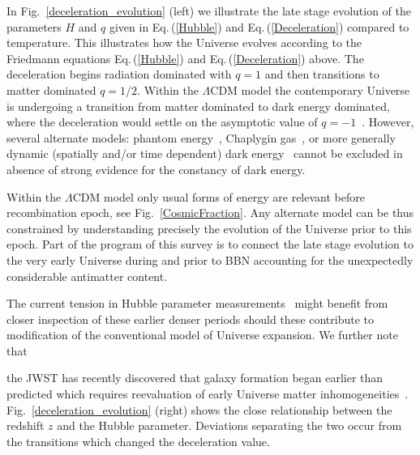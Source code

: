\documentclass[universe,article,submit,moreauthors,pdftex,a4paper]{Definitions/mdpi}
\newcommand{\req}[1]{Eq.\,(\ref{#1})}
\newcommand*{\rf}[1]{Fig.~{\ref{#1}}}
\newcommand*{\xblue}{\color{black}}
\begin{document}
In \rf{deceleration_evolution} (left) we illustrate the late stage evolution of the parameters $H$ and $q$ given in \req{Hubble} and \req{Deceleration} compared to temperature. This illustrates how the Universe evolves according to the Friedmann equations \req{Hubble} and \req{Deceleration} above. The deceleration begins radiation dominated with $q=1$ and then transitions to matter dominated $q=1/2$.  {\xblue Within the $\Lambda$CDM model} the contemporary Universe is undergoing a transition from matter dominated to dark energy dominated, where the deceleration would  settle on the asymptotic value of $q=-1$~\cite{Rafelski:2013yka}. {\xblue However, several alternate models:  phantom energy~\cite{Caldwell:2003vq}, Chaplygin gas~\cite{Bilic:2001cg}, or more generally dynamic (spatially and/or time dependent) dark energy~\cite{Benevento:2020fev} cannot be excluded in absence of strong evidence for the constancy of dark energy.}

{\xblue Within the $\Lambda$CDM model only usual forms of energy are relevant before recombination epoch, see \rf{CosmicFraction}. Any alternate model can be thus constrained by understanding precisely the evolution of the Universe prior to this epoch. Part of the program of this survey is to connect the late stage evolution to the very early Universe during and prior to BBN  accounting for the unexpectedly considerable antimatter content. 

The current tension in Hubble parameter measurements~\cite{Perivolaropoulos:2021jda,DiValentino:2021izs,Aluri:2022hzs} might benefit from closer inspection of these earlier denser periods should these contribute to modification of the conventional model of Universe expansion. We further note that} the JWST has recently discovered that galaxy formation began earlier than predicted which requires reevaluation of early Universe matter inhomogeneities~\cite{Yan:2022sxd}. \rf{deceleration_evolution} (right) shows the close relationship between the redshift $z$ and the Hubble parameter. Deviations separating the two occur from the transitions which changed the deceleration value.
\end{document}
